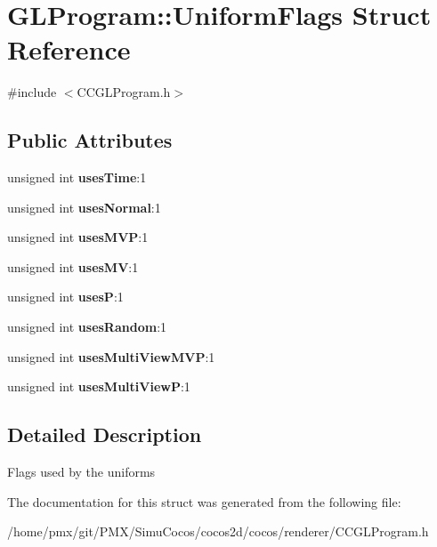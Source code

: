 \hypertarget{structGLProgram_1_1UniformFlags}{}\section{G\+L\+Program\+:\+:Uniform\+Flags Struct Reference}
\label{structGLProgram_1_1UniformFlags}


{\ttfamily \#include $<$C\+C\+G\+L\+Program.\+h$>$}

\subsection*{Public Attributes}
\begin{DoxyCompactItemize}
\item 
\mbox{\label{structGLProgram_1_1UniformFlags_a33c4581287005ca6b54f702ace306c88}} 
unsigned int {\bfseries uses\+Time}\+:1
\item 
\mbox{\label{structGLProgram_1_1UniformFlags_a7c3674bf16d12a0d95409697aff28b24}} 
unsigned int {\bfseries uses\+Normal}\+:1
\item 
\mbox{\label{structGLProgram_1_1UniformFlags_a2dc61690ac2b820b1d3c4fe14f6d53a5}} 
unsigned int {\bfseries uses\+M\+VP}\+:1
\item 
\mbox{\label{structGLProgram_1_1UniformFlags_a70c41c22b4fecc8a9b6e9d3d9cf32890}} 
unsigned int {\bfseries uses\+MV}\+:1
\item 
\mbox{\label{structGLProgram_1_1UniformFlags_a894e89bf404f86ce743ff2c4a1ecf4f4}} 
unsigned int {\bfseries usesP}\+:1
\item 
\mbox{\label{structGLProgram_1_1UniformFlags_ad339710ba8eb4975a838f1dcfeee08eb}} 
unsigned int {\bfseries uses\+Random}\+:1
\item 
\mbox{\label{structGLProgram_1_1UniformFlags_affb3fe5c0c73ca59f94346a2495b56e7}} 
unsigned int {\bfseries uses\+Multi\+View\+M\+VP}\+:1
\item 
\mbox{\label{structGLProgram_1_1UniformFlags_a677aa269ccd61ea10c4c84e9d4e169c9}} 
unsigned int {\bfseries uses\+Multi\+ViewP}\+:1
\end{DoxyCompactItemize}


\subsection{Detailed Description}
Flags used by the uniforms 

The documentation for this struct was generated from the following file\+:\begin{DoxyCompactItemize}
\item 
/home/pmx/git/\+P\+M\+X/\+Simu\+Cocos/cocos2d/cocos/renderer/C\+C\+G\+L\+Program.\+h\end{DoxyCompactItemize}
